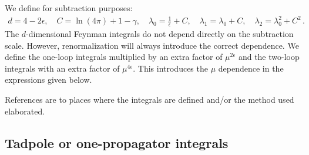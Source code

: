 \documentclass[12pt,a4paper]{article}
\begin{document}
We define for subtraction purposes:
\begin{align}
\label{defCC}
d = 4-2\epsilon,\quad C=\ln(4\pi)+1-\gamma,\quad
\lambda_0 = \frac{1}{\epsilon}+C,\quad\lambda_1=\lambda_0+C,\quad
\lambda_2=\lambda_0^2+C^2\,.
\end{align}
The $d$-dimensional Feynman integrals do not depend directly on the subtraction
scale. However, renormalization will always introduce the correct dependence.
We define the one-loop integrals multiplied by an extra factor
of $\mu^{2\epsilon}$ and the two-loop integrals with an extra factor
of $\mu^{4\epsilon}$. This introduces the $\mu$ dependence in the expressions
given below.

References are to places where the integrals are defined and/or the method used
elaborated.

\subsection{Tadpole or one-propagator integrals}
\label{tadpoles}
\end{document}
